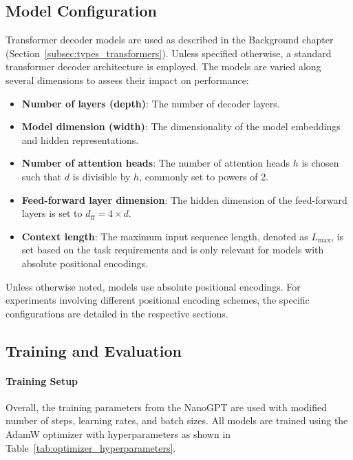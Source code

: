 \subsection{Model Configuration}

Transformer decoder models are used as described in the Background chapter (Section~\ref{subsec:types_transformers}). Unless specified otherwise, a standard transformer decoder architecture is employed. The models are varied along several dimensions to assess their impact on performance:

\begin{itemize}
    \item \textbf{Number of layers (depth)}: The number of decoder layers.
    \item \textbf{Model dimension (width)}: The dimensionality of the model embeddings and hidden representations.
    \item \textbf{Number of attention heads}: The number of attention heads $h$ is chosen such that $d$ is divisible by $h$, commonly set to powers of 2.
    \item \textbf{Feed-forward layer dimension}: The hidden dimension of the feed-forward layers is set to $d_{\text{ff}} = 4 \times d$.
    \item \textbf{Context length}: The maximum input sequence length, denoted as $L_{\text{max}}$, is set based on the task requirements and is only relevant for models with absolute positional encodings.
\end{itemize}

Unless otherwise noted, models use absolute positional encodings. For experiments involving different positional encoding schemes, the specific configurations are detailed in the respective sections.

\subsection{Training and Evaluation}

\paragraph{Training Setup}
Overall, the training parameters from the NanoGPT \parencite{karpathy_nanogpt_2022} are used with modified number of steps, learning rates, and batch sizes. All models are trained using the AdamW optimizer with hyperparameters as shown in Table~\ref{tab:optimizer_hyperparameters}.

